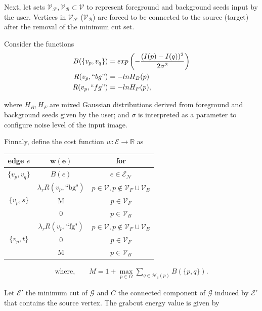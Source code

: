 Next, let sets $\mathcal{V_F}, \mathcal{V_B} \subset \mathcal{V}$ to represent foreground and background seeds input by the user. Vertices in $\mathcal{V_F}$ ($\mathcal{V_B}$) are forced to be connected to the source (target) after the removal of the minimum cut set.

Consider the functions
\begin{align*}
	B(\{v_p,v_q\}) &= exp \left( -\frac{ (I(p) - I(q))^2}{2\sigma ^2} \right) \\
	R(v_p,``bg") &= -ln H_B(p)\\
	R(v_p,``fg") &= -ln H_F(p),
\end{align*}

where $H_B,H_F$ are mixed Gaussian distributions derived from  foreground and background seeds given by the user; and $\sigma$ is interpreted as a parameter to configure noise level of the input image.

Finnaly, define the cost function $w:\mathcal{E}\rightarrow \mathbb{R}$ as

\begin{table}[H]
\centering
\setlength{\extrarowheight}{0.75em}
\begin{tabular}{|c|c|c|}
\hline
\textbf{edge} $e$ & $\mathbf{w(e)}$ & \textbf{for}\\
\hline
$\{v_p, v_q\}$ & $B(e)$ & $e \in \mathcal{E}_{\mathcal{N}}$\\
\hline
\multirow{3}{*}{$\{v_p, s\}$} & $\lambda_r R(v_p,\text{``bg"})$ & $p \in \mathcal{\mathcal{V}}, p \notin \mathcal{\mathcal{V}}_F \cup \mathcal{\mathcal{V}}_B$\\
& M & $p \in \mathcal{\mathcal{V}}_F$ \\
& 0 & $p \in \mathcal{\mathcal{V}}_B$ \\
\hline
\multirow{3}{*}{$\{v_p, t\}$} & $\lambda_r R(v_p,\text{``fg"})$ & $p \in \mathcal{\mathcal{V}}, p \notin \mathcal{\mathcal{V}}_F \cup \mathcal{\mathcal{V}}_B$\\
& 0 & $p \in \mathcal{\mathcal{V}}_F$ \\
& M & $p \in \mathcal{\mathcal{V}}_B$ \\
\hline
\end{tabular}
\begin{align*}
\text{where,} \qquad M = 1 + \max_{p \in \Omega}{\sum_{q \in \mathcal{N}_4(p)}}{B(\{p,q\})}.
\end{align*}
\end{table}

Let $\mathcal{E}'$ the minimum cut of $\mathcal{G}$ and $C$ the connected component of $\mathcal{G}$ induced by $\mathcal{E}'$ that contains the source vertex. The grabcut energy value is given by

